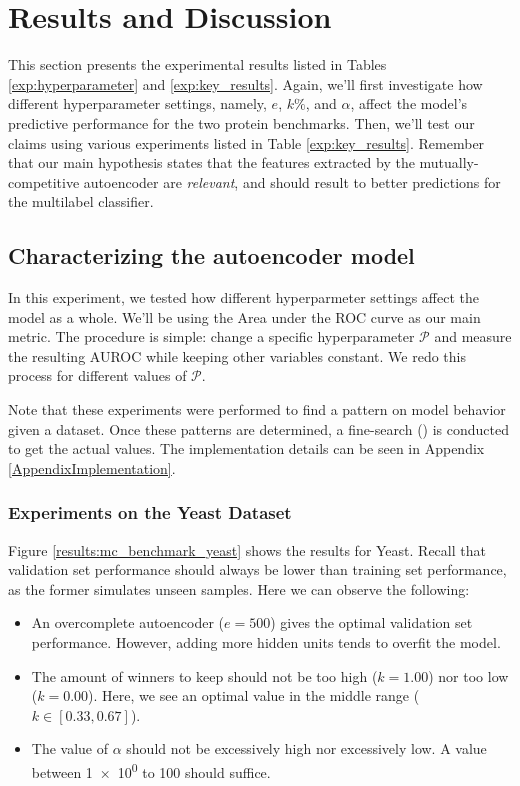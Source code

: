 \section{Results and Discussion}
\label{MCResults}

\par This section presents the experimental results listed in Tables
\ref{exp:hyperparameter} and \ref{exp:key_results}. Again, we'll first
investigate how different hyperparameter settings, namely, $e$, $k\%$, and
$\alpha$, affect the model's predictive performance for the two protein
benchmarks. Then, we'll test our claims using various experiments listed in
Table \ref{exp:key_results}. Remember that our main hypothesis states that the
features extracted by the mutually-competitive autoencoder are
\textit{relevant}, and should result to better predictions for the multilabel
classifier.

\newpage
\subsection{Characterizing the autoencoder model}

In this experiment, we tested how different hyperparmeter settings affect the
model as a whole. We'll be using the Area under the ROC curve as our main
metric. The procedure is simple: change a specific hyperparameter
$\mathcal{P}$ and measure the resulting AUROC while keeping other variables
constant. We redo this process for different values of $\mathcal{P}$. 

\par Note that these experiments were performed to find a pattern on model
behavior given a dataset. Once these patterns are determined, a fine-search
(\cite{bergstra2012random}) is conducted to get the actual values. The
implementation details can be seen in Appendix \ref{AppendixImplementation}.

\subsubsection{Experiments on the Yeast Dataset}

Figure \ref{results:mc_benchmark_yeast} shows the results for Yeast. Recall
that validation set performance should always be lower than training set
performance, as the former simulates unseen samples. Here we can observe the
following:

\begin{itemize}
  \item An overcomplete autoencoder ($e=500$) gives the optimal validation
  set performance. However, adding more hidden units tends to overfit the
  model.
  \item The amount of winners to keep should not be too high ($k=1.00$) nor
  too low ($k=0.00$). Here, we see an optimal value in the middle range
  ($k\in\left[0.33, 0.67\right]$).
  \item The value of $\alpha$ should not be excessively high nor excessively
  low. A value between \num{1e0} to \num{100} should suffice.
\end{itemize}


